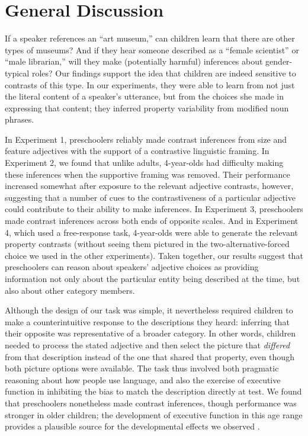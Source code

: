 \documentclass[man]{apa2}
\begin{document}
\section{General Discussion}

If a speaker references an ``art museum,'' can children learn that there are other types of museums? And if they hear someone described as a ``female scientist'' or ``male librarian,'' will they make (potentially harmful) inferences about gender-typical roles? Our findings support the idea that children are indeed sensitive to contrasts of this type. In our experiments, they were able to learn from not just the literal content of a speaker's utterance, but from the choices she made in expressing that content; they inferred property variability from modified noun phrases.

In Experiment 1, preschoolers reliably made contrast inferences from size and feature adjectives with the support of a contrastive linguistic framing.  In Experiment 2, we found that unlike adults, 4-year-olds had difficulty making these inferences when the supportive framing was removed. Their performance increased somewhat after exposure to the relevant adjective contrasts, however, suggesting that a number of cues to the contrastiveness of a particular adjective could contribute to their ability to make inferences. In Experiment 3, preschoolers made contrast inferences across both ends of opposite scales. And in Experiment 4, which used a free-response task, 4-year-olds were able to generate the relevant property contrasts (without seeing them pictured in the two-alternative-forced choice we used in the other experiments). Taken together, our results suggest that preschoolers can reason about speakers' adjective choices as providing information not only about the particular entity being described at the time, but also about other category members. 

Although the design of our task was simple, it nevertheless required children to make a counterintuitive response to the descriptions they heard: inferring that their opposite was representative of a broader category. In other words, children needed to process the stated adjective and then select the picture that \emph{differed} from that description instead of the one that shared that property, even though both picture options were available. The task thus involved both pragmatic reasoning about how people use language, and also the exercise of executive function in inhibiting the bias to  match the description directly at test.  We found that preschoolers nonetheless made contrast inferences, though performance was stronger in older children; the development of executive function in this age range provides a plausible source for the developmental effects we observed \cite{davidson2006,zelazo2003}. 
\end{document}
